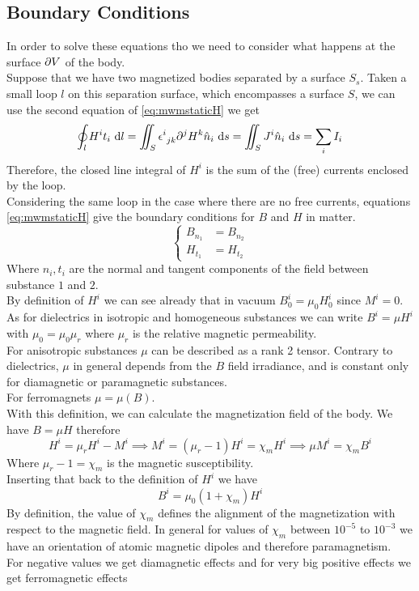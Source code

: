 \documentclass[../electromagnetism.tex]{subfiles}
\begin{document}
\subsection{Boundary Conditions}
In order to solve these equations tho we need to consider what happens at the surface $\partial V$ of the body.\\
Suppose that we have two magnetized bodies separated by a surface $S_s$. Taken a small loop $l$ on this separation surface, which encompasses a surface $S$, we can use the second equation of \eqref{eq:mwmstaticH} we get
\begin{equation}
	\oint_lH^it_i\ \mathrm{d} l=\iint_S\epsilon^{i}_{\ jk}\partial^jH^k\hat{n}_i\ \mathrm{d} s=\iint_SJ^i\hat{n}_i\ \mathrm{d} s=\sum_iI_i
	\label{eq:sumofcurrents}
\end{equation}
Therefore, the closed line integral of $H^i$ is the sum of the (free) currents enclosed by the loop.\\
Considering the same loop in the case where there are no free currents, equations \eqref{eq:mwmstaticH} give the boundary conditions for $B$ and $H$ in matter.\\
\begin{equation}
	\left\{ \begin{aligned}
			B_{n_1}&=B_{n_2}\\
			H_{t_1}&=H_{t_2}
	\end{aligned}\right.
	\label{eq:boundcbh}
\end{equation}
Where $n_i,t_i$ are the normal and tangent components of the field between substance $1$ and $2$.\\
By definition of $H^i$ we can see already that in vacuum $B_0^i=\mu_0H^i_0$ since $M^i=0$. As for dielectrics in isotropic and homogeneous substances we can write $B^i=\mu H^i$ with $\mu_0=\mu_0\mu_r$ where $\mu_r$ is the relative magnetic permeability.\\
For anisotropic substances $\mu$ can be described as a rank 2 tensor. Contrary to dielectrics, $\mu$ in general depends from the $B$ field irradiance, and is constant only for diamagnetic or paramagnetic substances.\\
For ferromagnets $\mu=\mu(B)$.\\
With this definition, we can calculate the magnetization field of the body. We have $B=\mu H$ therefore
\begin{equation}
	H^i=\mu_rH^i-M^i\implies M^i=(\mu_r-1)H^i=\chi_mH^i\implies\mu M^i=\chi_mB^i
	\label{eq:magneticsus}
\end{equation}
Where $\mu_r-1=\chi_m$ is the magnetic susceptibility.\\
Inserting that back to the definition of $H^i$ we have
\begin{equation}
	B^i=\mu_0\left( 1+\chi_m \right)H^i
	\label{eq:magsusbh}
\end{equation}
By definition, the value of $\chi_m$ defines the alignment of the magnetization with respect to the magnetic field. In general for values of $\chi_m$ between $10^{-5}$ to $10^{-3}$ we have an orientation of atomic magnetic dipoles and therefore paramagnetism.\\
For negative values we get diamagnetic effects and for very big positive effects we get ferromagnetic effects
\end{document}
